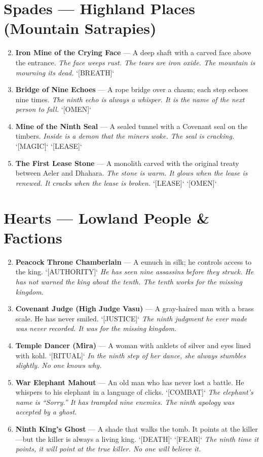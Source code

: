 \section*{Spades --- Highland Places (Mountain Satrapies)}
\label{sec:dhahara-highland-places}
\begin{enumerate}
\setcounter{enumi}{1}
\item \textbf{Iron Mine of the Crying Face} --- A deep shaft with a carved face above the entrance.
  \hfill \textit{The face weeps rust. The tears are iron oxide. The mountain is mourning its dead.} `[BREATH]`
\item \textbf{Bridge of Nine Echoes} --- A rope bridge over a chasm; each step echoes nine times.
  \hfill \textit{The ninth echo is always a whisper. It is the name of the next person to fall.} `[OMEN]`
\item \textbf{Mine of the Ninth Seal} --- A sealed tunnel with a Covenant seal on the timbers.
  \hfill \textit{Inside is a demon that the miners woke. The seal is cracking.} `[MAGIC]` `[LEASE]`
\item \textbf{The First Lease Stone} --- A monolith carved with the original treaty between Aeler and Dhahara.
  \hfill \textit{The stone is warm. It glows when the lease is renewed. It cracks when the lease is broken.} `[LEASE]` `[OMEN]`
\end{enumerate}

\section*{Hearts --- Lowland People \& Factions}
\label{sec:dhahara-lowland-people}
\begin{enumerate}
\setcounter{enumi}{1}
\item \textbf{Peacock Throne Chamberlain} --- A eunuch in silk; he controls access to the king. `[AUTHORITY]`
  \hfill \textit{He has seen nine assassins before they struck. He has not warned the king about the tenth. The tenth works for the missing kingdom.}
\item \textbf{Covenant Judge (High Judge Vasu)} --- A gray-haired man with a brass scale. He has never smiled. `[JUSTICE]`
  \hfill \textit{The ninth judgment he ever made was never recorded. It was for the missing kingdom.}
\item \textbf{Temple Dancer (Mira)} --- A woman with anklets of silver and eyes lined with kohl. `[RITUAL]`
  \hfill \textit{In the ninth step of her dance, she always stumbles slightly. No one knows why.}
\item \textbf{War Elephant Mahout} --- An old man who has never lost a battle. He whispers to his elephant in a language of clicks. `[COMBAT]`
  \hfill \textit{The elephant's name is ``Sorry.'' It has trampled nine enemies. The ninth apology was accepted by a ghost.}
\item \textbf{Ninth King's Ghost} --- A shade that walks the tomb. It points at the killer---but the killer is always a living king. `[DEATH]` `[FEAR]`
  \hfill \textit{The ninth time it points, it will point at the true killer. No one will believe it.}
\end{enumerate}


